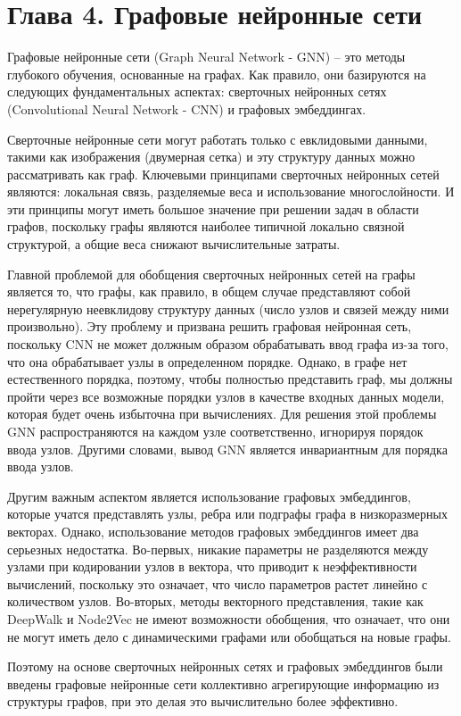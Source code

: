 \section{Глава 4. Графовые нейронные сети}
Графовые нейронные сети (Graph Neural Network - GNN) -- это методы глубокого обучения, основанные на графах. Как правило, они базируются на следующих фундаментальных аспектах: сверточных нейронных сетях (Convolutional Neural Network - CNN) и графовых эмбеддингах. 

Сверточные нейронные сети могут работать только с евклидовыми данными, такими как изображения (двумерная сетка) и эту структуру данных можно рассматривать как граф. Ключевыми принципами сверточных нейронных сетей являются: локальная связь, разделяемые веса и использование многослойности. И эти принципы могут иметь большое значение при решении задач в области графов, поскольку графы являются наиболее типичной локально связной структурой, а общие веса снижают вычислительные затраты. 

Главной проблемой для обобщения сверточных нейронных сетей на графы является то, что графы, как правило, в общем случае представляют собой нерегулярную неевклидову структуру данных (число узлов и связей между ними произвольно). Эту проблему и призвана решить графовая нейронная сеть, поскольку CNN не может должным образом обрабатывать ввод графа из-за того, что она обрабатывает  узлы в определенном порядке. Однако, в графе нет естественного порядка, поэтому, чтобы полностью представить граф, мы должны пройти через все возможные порядки узлов в качестве входных данных модели, которая будет очень избыточна при вычислениях. Для решения этой проблемы GNN распространяются на каждом узле соответственно, игнорируя порядок ввода узлов. Другими словами, вывод GNN является инвариантным для порядка ввода узлов. 

Другим важным аспектом является использование графовых эмбеддингов, которые учатся представлять узлы, ребра или подграфы графа в низкоразмерных векторах. Однако, использование методов графовых эмбеддингов имеет два серьезных недостатка. Во-первых, никакие параметры не разделяются между узлами при кодировании узлов в вектора, что приводит к неэффективности вычислений, поскольку это означает, что число параметров растет линейно с количеством узлов. Во-вторых, методы векторного представления, такие как DeepWalk и Node2Vec не имеют возможности обобщения, что означает, что они не могут иметь дело с динамическими графами или обобщаться на новые графы.

Поэтому на основе сверточных нейронных сетях и графовых эмбеддингов были введены графовые нейронные сети коллективно агрегирующие информацию из структуры графов, при это делая это вычислительно более эффективно.

